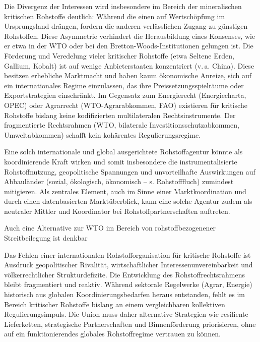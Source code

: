 \documentclass[12pt,a4paper,oneside]{book} %
\begin{document}
{Die Divergenz der Interessen wird insbesondere im Bereich der mineralischen kritischen Rohstoffe deutlich: Während die einen auf Wertschöpfung im Ursprungsland drängen, fordern die anderen verlässlichen Zugang zu günstigen Rohstoffen. Diese Asymmetrie verhindert die Herausbildung eines Konsenses, wie er etwa in der WTO oder bei den Bretton-Woods-Institutionen gelungen ist. Die Förderung und Veredelung vieler kritischer Rohstoffe (etwa Seltene Erden, Gallium, Kobalt) ist auf wenige Anbieterstaaten konzentriert (v. a. China). Diese besitzen erhebliche Marktmacht und haben kaum ökonomische Anreize, sich auf ein internationales Regime einzulassen, das ihre Preissetzungsspielräume oder Exportstrategien einschränkt. Im Gegensatz zum Energierecht (Energiecharta, OPEC) oder Agrarrecht (WTO-Agrarabkommen, FAO) existieren für kritische Rohstoffe bislang keine kodifizierten multilateralen Rechtsinstrumente. Der fragmentierte Rechtsrahmen (WTO, bilaterale Investitionsschutzabkommen, Umweltabkommen) schafft kein kohärentes Regulierungsregime.

Eine solch internationale und global ausgerichtete Rohstoffagentur könnte als koordinierende Kraft wirken und somit insbesondere die instrumentalisierte Rohstoffnutzung, geopolitische Spannungen und unvorteilhafte Auswirkungen auf Abbauländer (sozial, ökologisch, ökonomisch -- s. Rohstofffluch) zumindest mitigieren. Als zentrales Element, auch im Sinne einer Marktkoordination und durch einen datenbasierten Marktüberblick, kann eine solche Agentur zudem als neutraler Mittler und Koordinator bei Rohstoffpartnerschaften auftreten.\autocite{Letter: Race for critical minerals sparks call for new materials agency}

Auch eine Alternative zur WTO im Bereich von rohstoffbezogenener Streitbeilegung ist denkbar

Das Fehlen einer internationalen Rohstofforganisation für kritische Rohstoffe ist Ausdruck geopolitischer Rivalität, wirtschaftlicher Interessenunvereinbarkeit und völkerrechtlicher Strukturdefizite. Die Entwicklung des Rohstoffrechtsrahmens bleibt fragmentiert und reaktiv. Während sektorale Regelwerke (Agrar, Energie) historisch aus globalen Koordinierungsbedarfen heraus entstanden, fehlt es im Bereich kritischer Rohstoffe bislang an einem vergleichbaren kollektiven Regulierungsimpuls. Die Union muss daher alternative Strategien wie resiliente Lieferketten, strategische Partnerschaften und Binnenförderung priorisieren, ohne auf ein funktionierendes globales Rohstoffregime vertrauen zu können.

}
\end{document}
